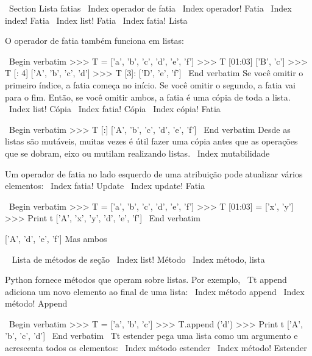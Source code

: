 \documentclass[10pt]{book}
\begin{document}
{{{{{{\ Section {Lista fatias}
\ Index {operador de fatia}
\ Index {operador! Fatia}
\ Index {index! Fatia}
\ Index {list! Fatia}
\ Index {fatia! Lista}

O operador de fatia também funciona em listas:

\ Begin {verbatim}
>>> T = ['a', 'b', 'c', 'd', 'e', ​​'f']
>>> T [01:03]
['B', 'c']
>>> T [: 4]
['A', 'b', 'c', 'd']
>>> T [3]:
['D', 'e', ​​'f']
\ End {verbatim}
%
Se você omitir o primeiro índice, a fatia começa no início.
Se você omitir o segundo, a fatia vai para o fim. Então, se você
omitir ambos, a fatia é uma cópia de toda a lista.
\ Index {list! Cópia}
\ Index {fatia! Cópia}
\ Index {cópia! Fatia}

\ Begin {verbatim}
>>> T [:]
['A', 'b', 'c', 'd', 'e', ​​'f']
\ End {verbatim}
%
Desde as listas são mutáveis, muitas vezes é útil fazer uma cópia
antes que as operações que se dobram, eixo ou mutilam realizando
listas.
\ Index {} mutabilidade

Um operador de fatia no lado esquerdo de uma atribuição
pode atualizar vários elementos:
\ Index {fatia! Update}
\ Index {update! Fatia}

\ Begin {verbatim}
>>> T = ['a', 'b', 'c', 'd', 'e', ​​'f']
>>> T [01:03] = ['x', 'y']
>>> Print t
['A', 'x', 'y', 'd', 'e', ​​'f']
\ End {verbatim}
%


%

['A', 'd', 'e', ​​'f']%
%
Mas ambos%


\ {} Lista de métodos de seção
\ Index {list! Método}
\ Index {método, lista}

Python fornece métodos que operam sobre listas. Por exemplo,
{\ Tt} append adiciona um novo elemento ao final de uma lista:
\ Index {método append}
\ Index {método! Append}

\ Begin {verbatim}
>>> T = ['a', 'b', 'c']
>>> T.append ('d')
>>> Print t
['A', 'b', 'c', 'd']
\ End {verbatim}
%
{\ Tt estender} pega uma lista como um argumento e acrescenta todos
os elementos:
\ Index {método estender}
\ Index {método! Estender}

}}}}}}
\end{document}
